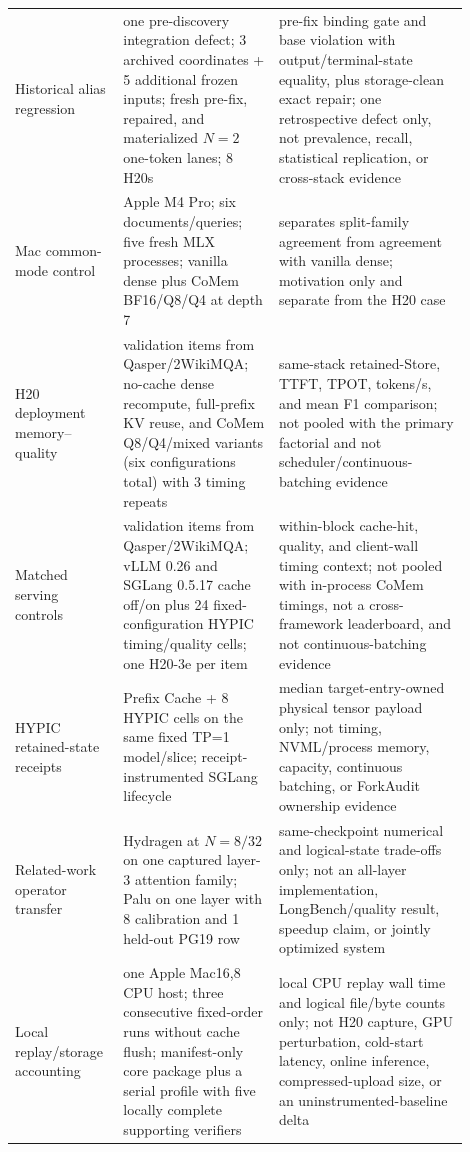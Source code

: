 \documentclass{article}
\begin{document}
\begin{longtable}{@{}>{\raggedright\arraybackslash}p{0.19\linewidth}>{\raggedright\arraybackslash}p{0.32\linewidth}>{\raggedright\arraybackslash}p{0.39\linewidth}@{}}
  Historical alias regression & one pre-discovery integration defect; 3 archived coordinates + 5 additional frozen inputs; fresh pre-fix, repaired, and materialized $N=2$ one-token lanes; 8 H20s & pre-fix binding gate and base violation with output/terminal-state equality, plus storage-clean exact repair; one retrospective defect only, not prevalence, recall, statistical replication, or cross-stack evidence \\
  Mac common-mode control & Apple M4 Pro; six documents/queries; five fresh MLX processes; vanilla dense plus CoMem BF16/Q8/Q4 at depth 7 & separates split-family agreement from agreement with vanilla dense; motivation only and separate from the H20 case \\
  H20 deployment memory--quality & 8 validation items from Qasper/2WikiMQA; no-cache dense recompute, full-prefix KV reuse, and CoMem Q8/Q4/mixed variants (six configurations total) with 3 timing repeats & same-stack retained-Store, TTFT, TPOT, tokens/s, and mean F1 comparison; not pooled with the primary factorial and not scheduler/continuous-batching evidence \\
  Matched serving controls & 8 validation items from Qasper/2WikiMQA; vLLM 0.26 and SGLang 0.5.17 cache off/on plus 24 fixed-configuration HYPIC timing/quality cells; one H20-3e per item & within-block cache-hit, quality, and client-wall timing context; not pooled with in-process CoMem timings, not a cross-framework leaderboard, and not continuous-batching evidence \\
  HYPIC retained-state receipts & 8 Prefix Cache + 8 HYPIC cells on the same fixed TP=1 model/slice; receipt-instrumented SGLang lifecycle & median target-entry-owned physical tensor payload only; not timing, NVML/process memory, capacity, continuous batching, or ForkAudit ownership evidence \\
  Related-work operator transfer & Hydragen at $N=8/32$ on one captured layer-3 attention family; Palu on one layer with 8 calibration and 1 held-out PG19 row & same-checkpoint numerical and logical-state trade-offs only; not an all-layer implementation, LongBench/quality result, speedup claim, or jointly optimized system \\
  Local replay/storage accounting & one Apple Mac16,8 CPU host; three consecutive fixed-order runs without cache flush; manifest-only core package plus a serial profile with five locally complete supporting verifiers & local CPU replay wall time and logical file/byte counts only; not H20 capture, GPU perturbation, cold-start latency, online inference, compressed-upload size, or an uninstrumented-baseline delta \\
\end{longtable}
\endgroup
\end{document}
